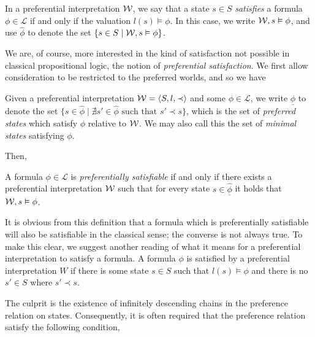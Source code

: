 \begin{definition}
  \label{definition:state-satisfaction} In a preferential interpretation $\mathcal{W}$, we say that a state $s \in S$ \emph{satisfies} a formula $\phi
  \in \mathcal{L}$ if and only if the valuation $l(s) \vDash \phi$. In this case, we write $\mathcal{W}, s \vDash \phi$, and use $\hat{\phi}$ to
  denote the set $\{s \in S \mid \mathcal{W},s \vDash \phi \}$.
\end{definition}

We are, of course, more interested in the kind of satisfaction not possible in classical propositional logic, the notion of \textit{preferential
satisfaction}. We first allow consideration to be restricted to the preferred worlds, and so we have

\begin{definition}
  \label{definition:state-minimal}

  Given a preferential interpretation $\mathcal{W} = \langle S,l,\prec \rangle$ and some $\phi \in \mathcal{L}$, we write $\underline{\hat{\phi}}$ to denote the set $\{s \in \hat
  {\phi}\mid \nexists s' \in \hat{\phi}\text{ such that }s' \prec s \}$, which is the set of \textit{preferred states} which satisfy $\phi$ relative
  to $\mathcal{W}$. We may also call this the set of \textit{minimal states} satisfying $\phi$.
\end{definition}

Then,

\begin{definition}
  \label{definition:preferentially-satisfiable} A formula $\phi \in \mathcal{L}$ is \emph{preferentially satisfiable} if and only if there
  exists a preferential interpretation $\mathcal{W}$ such that for every state $s \in \underline{\hat{\phi}}$ it holds that $\mathcal{W}, s \vDash \phi$.
\end{definition}

It is obvious from this definition that a formula which is preferentially satisfiable will also be satisfiable in the classical sense; the converse
is not always true. To make this clear, we suggest another reading of what it means for a preferential interpretation to satisfy a formula.
A formula $\phi$ is satisfied by a preferential interpretation $W$ if there is some state $s \in S$ such that $l(s) \vDash \phi$ and there
is no $s' \in S$ where $s' \prec s$.

The culprit is the existence of infinitely descending chains in the preference relation on states. Consequently, it is often required that
the preference relation satisfy the following condition,

